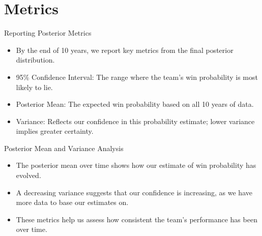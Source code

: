 \section{Metrics}

\begin{frame}{Reporting Posterior Metrics}

  \begin{itemize}
    \item By the end of 10 years, we report key metrics from the final posterior distribution.
    \item 95\% Confidence Interval: The range where the team’s win probability is most likely to lie.
    \item Posterior Mean: The expected win probability based on all 10 years of data.
    \item Variance: Reflects our confidence in this probability estimate; lower variance implies greater certainty.
  \end{itemize}
  
\end{frame}

\begin{frame}{Posterior Mean and Variance Analysis}

  \begin{itemize}
    \item The posterior mean over time shows how our estimate of win probability has evolved.
    \item A decreasing variance suggests that our confidence is increasing, as we have more data to base our estimates on.
    \item These metrics help us assess how consistent the team’s performance has been over time.
  \end{itemize}
  
\end{frame}

